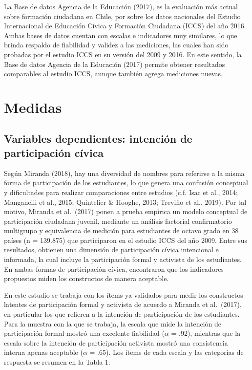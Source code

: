 \documentclass[12pt,twoside]{templates/facsothesis}
\begin{document}
La Base de datos Agencia de la Educación (2017), es la evaluación más actual sobre formación ciudadana en Chile, por sobre los datos nacionales del Estudio Internacional de Educación Cívica y Formación Ciudadana (ICCS) del año 2016. Ambas bases de datos cuentan con escalas e indicadores muy similares, lo que brinda respaldo de fiabilidad y validez a las mediciones, las cuales han sido probadas por el estudio ICCS en su versión del 2009 y 2016. En este sentido, la Base de datos Agencia de la Educación (2017) permite obtener resultados comparables al estudio ICCS, aunque también agrega mediciones nuevas.
\newpage

\hypertarget{medidas}{%
\section{Medidas}\label{medidas}}

\hypertarget{variables-dependientes-intenciuxf3n-de-participaciuxf3n-cuxedvica}{%
\subsection{Variables dependientes: intención de participación cívica}\label{variables-dependientes-intenciuxf3n-de-participaciuxf3n-cuxedvica}}

Según Miranda (2018), hay una diversidad de nombres para referirse a la misma forma de participación de los estudiantes, lo que genera una confusión conceptual y dificultades para realizar comparaciones entre estudios (c.f. Isac et al., 2014; Manganelli et al., 2015; Quintelier \& Hooghe, 2013; Treviño et al., 2019). Por tal motivo, Miranda et al.~(2017) ponen a prueba empírica un modelo conceptual de participación ciudadana juvenil, mediante un análisis factorial confirmatorio multigrupo y equivalencia de medición para estudiantes de octavo grado en 38 países (n = 139.875) que participaron en el estudio ICCS del año 2009. Entre sus resultados, obtienen una dimensión de participación cívica intencional e informada, la cual incluye la participación formal y activista de los estudiantes. En ambas formas de participación cívica, encontraron que los indicadores propuestos miden los constructos de manera aceptable.

En este estudio se trabaja con los ítems ya validados para medir los constructos latentes de participación formal y activista de acuerdo a Miranda et al.~(2017), en particular los que refieren a la intención de participación de los estudiantes. Para la muestra con la que se trabaja, la escala que mide la intención de participación formal mostró una excelente fiabilidad (\(\alpha\) = .92), mientras que la escala sobre la intención de participación activista mostró una consistencia interna apenas aceptable (\(\alpha\) = .65). Los ítems de cada escala y las categorías de respuesta se resumen en la Tabla 1.
\end{document}
